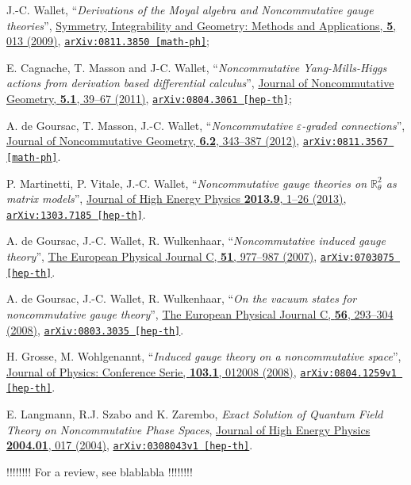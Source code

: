 \documentclass[a4paper,11pt,twoside]{article}
\numberwithin{equation}{section}
\newcommand{\doi}[2]{\href{http://dx.doi.org/#1}{#2}}
\newcommand{\arxiv}[3]{\href{#3}{\texttt{arXiv:#1 [#2]}}}
\theoremstyle{nonumberplain}
\newcounter{and}
\begin{document}
\begin{thebibliography}{88}
%
J.-C. Wallet, %
``\emph{Derivations of the Moyal algebra and Noncommutative gauge theories}'', %
\href{10.3842/SIGMA.2009.013}{Symmetry, Integrability and Geometry: Methods and Applications, \textbf{5}, 013 (2009)}, %
\arxiv{0811.3850}{math-ph}{http://arxiv.org/abs/arXiv:0811.3850};\par%
E. Cagnache, T. Masson and J-C. Wallet, %
``\emph{Noncommutative Yang-Mills-Higgs actions from derivation based differential calculus}'', %
\doi{10.4171/JNCG/69}{Journal of Noncommutative Geometry, \textbf{5.1}, 39--67 (2011)}, %
\arxiv{0804.3061}{hep-th}{http://arxiv.org/abs/arXiv:0804.3061};\par%
A. de Goursac, T. Masson, J.-C. Wallet, %
``\emph{Noncommutative $\varepsilon$-graded connections}'', %
\doi{10.4171/JNCG/94}{Journal of Noncommutative Geometry, \textbf{6.2}, 343--387 (2012)}, %
\arxiv{0811.3567}{math-ph}{http://arxiv.org/abs/arXiv:0811.3567}.%

%
P. Martinetti, P. Vitale, J.-C. Wallet, %
``\emph{Noncommutative gauge theories on $\mathbb{R}^2_\theta$ as matrix models}'', %
\doi{10.1007/JHEP09(2013)051}{Journal of High Energy Physics \textbf{2013.9}, 1--26 (2013)}, %
\arxiv{1303.7185}{hep-th}{http://arxiv.org/abs/1303.7185}.%

%
A. de Goursac, J.-C. Wallet, R. Wulkenhaar, %
``\emph{Noncommutative induced gauge theory}'', %
\doi{10.1140/epjc/s10052-007-0335-2}{The European Physical Journal C, \textbf{51}, 977--987 (2007)}, %
\arxiv{0703075}{hep-th}{http://arxiv.org/abs/hep-th/0703075}.%

%
A. de Goursac, J.-C. Wallet, R. Wulkenhaar, %
``\emph{On the vacuum states for noncommutative gauge theory}'', %
\doi{10.1140/epjc/s10052-008-0652-0}{The European Physical Journal C, \textbf{56}, 293--304 (2008)}, %
\arxiv{0803.3035}{hep-th}{http://arxiv.org/abs/arXiv:0803.3035}.%

%
H. Grosse, M. Wohlgenannt, %
``\emph{Induced gauge theory on a noncommutative space}'', %
\doi{10.1088/1742-6596/103/1/012008}{Journal of Physics: Conference Serie, \textbf{103.1}, 012008 (2008)}, %
\arxiv{0804.1259v1}{hep-th}{http://arxiv.org/abs/0804.1259v1}.%

%
E. Langmann, R.J. Szabo and K. Zarembo, %
\emph{Exact Solution of Quantum Field Theory on Noncommutative Phase Spaces}, %
\doi{10.1088/1126-6708/2004/01/017}{Journal of High Energy Physics \textbf{2004.01}, 017 (2004)}, %
\arxiv{0308043v1}{hep-th}{http://arxiv.org/abs/hep-th/0308043v1}.%

%
!!!!!!!! For a review, see blablabla !!!!!!!!%

\end{thebibliography}

\end{document}
